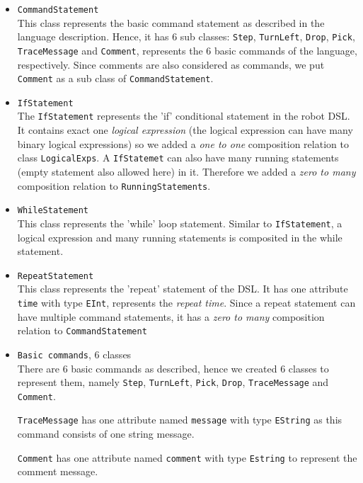 \documentclass[a4paper, 11pt]{article}
\begin{document}
\begin{itemize}
\item \texttt{CommandStatement} \\
This class represents the basic command statement as described in the language description. Hence, it has 6 sub classes: \texttt{Step}, \texttt{TurnLeft}, \texttt{Drop}, \texttt{Pick}, \texttt{TraceMessage} and \texttt{Comment}, represents the 6 basic commands of the language, respectively. Since comments are also considered as commands, we put \texttt{Comment} as a sub class of \texttt{CommandStatement}. 

\item \texttt{IfStatement} \\
The \texttt{IfStatement} represents the 'if' conditional statement in the robot DSL. It contains exact one \textit{logical expression} (the logical expression can have many binary logical expressions) so we added a \textit{one to one} composition relation to class \texttt{LogicalExps}. A \texttt{IfStatemet} can also have many running statements (empty statement also allowed here) in it. Therefore we added a \textit{zero to many} composition relation to \texttt{RunningStatements}. 

\item \texttt{WhileStatement} \\
This class represents the 'while' loop statement. Similar to \texttt{IfStatement}, a logical expression and many running statements is composited in the while statement. 

\item \texttt{RepeatStatement} \\
This class represents the 'repeat' statement of the DSL. It has one attribute \texttt{time} with type \texttt{EInt}, represents the \textit{repeat time}. Since a repeat statement can have multiple command statements, it has a \textit{zero to many} composition relation to \texttt{CommandStatement} 

\item \texttt{Basic commands}, 6 classes \\
There are 6 basic commands as described, hence we created 6 classes to represent them, namely \texttt{Step}, \texttt{TurnLeft}, \texttt{Pick}, \texttt{Drop}, \texttt{TraceMessage} and \texttt{Comment}. \bigbreak

\texttt{TraceMessage} has one attribute named \texttt{message} with type \texttt{EString} as this command consists of one string message. \bigbreak

\texttt{Comment} has one attribute named \texttt{comment} with type \texttt{Estring} to represent the comment message. 


\end{itemize}
\end{document}
